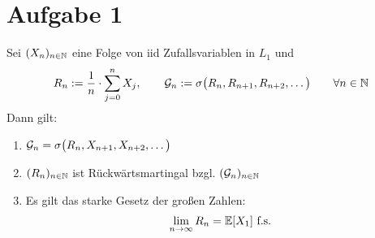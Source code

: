 \documentclass[12pt,a4paper]{article}
\author{Willi Sontopski}
\begin{document}
\section*{Aufgabe 1}
Sei $(X_n)_{n\in\mathbb{N}}$ eine Folge von iid Zufallsvariablen in $L_1$ und 
\begin{align*}
R_n:=\frac{1}{n}\cdot\sum\limits_{j=0}^n X_j,\qquad
\mathcal{G}_n:=\sigma\big(R_n,R_{n+1},R_{n+2},\ldots\big)\qquad\forall n\in\mathbb{N}
\end{align*}
Dann gilt:
\begin{enumerate}[label=\alph*)]
\item $\mathcal{G}_n=\sigma\big(R_n,X_{n+1},X_{n+2},\ldots\big)$
\item $(R_n)_{n\in\mathbb{N}}$ ist Rückwärtsmartingal bzgl. $(\mathcal{G}_n)_{n\in\mathbb{N}}$
\item Es gilt das starke Gesetz der großen Zahlen:
\begin{align*}
\lim\limits_{n\to\infty} R_n=\mathbb{E}[X_1]\text{ f.s.}
\end{align*}
\end{enumerate}
\end{document}
